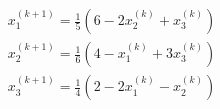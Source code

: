 \documentclass[preview]{standalone}
\begin{document}
\begin{align*}
x_1^{(k+1)} = \frac{1}{5} \left( 6 - 2 x_2^{(k)} + x_3^{(k)} \right) \\x_2^{(k+1)} = \frac{1}{6} \left( 4 - x_1^{(k)} + 3 x_3^{(k)} \right) \\x_3^{(k+1)} = \frac{1}{4} \left( 2 - 2 x_1^{(k)} - x_2^{(k)} \right)
\end{align*}
\end{document}
